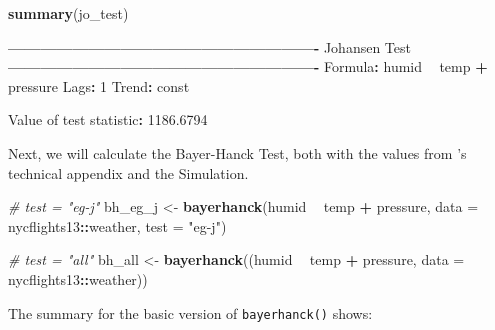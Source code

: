 \documentclass[11pt,a4paper]{article}
\newenvironment{Shaded}{\begin{snugshade}}{\end{snugshade}}
\newcommand{\CommentTok}[1]{\textcolor[rgb]{0.56,0.35,0.01}{\textit{#1}}}
\newcommand{\DataTypeTok}[1]{\textcolor[rgb]{0.13,0.29,0.53}{#1}}
\newcommand{\DecValTok}[1]{\textcolor[rgb]{0.00,0.00,0.81}{#1}}
\newcommand{\FloatTok}[1]{\textcolor[rgb]{0.00,0.00,0.81}{#1}}
\newcommand{\KeywordTok}[1]{\textcolor[rgb]{0.13,0.29,0.53}{\textbf{#1}}}
\newcommand{\NormalTok}[1]{#1}
\newcommand{\OperatorTok}[1]{\textcolor[rgb]{0.81,0.36,0.00}{\textbf{#1}}}
\newcommand{\StringTok}[1]{\textcolor[rgb]{0.31,0.60,0.02}{#1}}
\begin{document}
\begin{Shaded}
\begin{Highlighting}[]
\KeywordTok{summary}\NormalTok{(jo_test)}

\OperatorTok{----------------------------------------------------------}
\NormalTok{Johansen Test}
\OperatorTok{----------------------------------------------------------}
\NormalTok{Formula}\OperatorTok{:}\StringTok{ }\NormalTok{humid }\OperatorTok{~}\StringTok{ }\NormalTok{temp }\OperatorTok{+}\StringTok{ }\NormalTok{pressure}
\NormalTok{Lags}\OperatorTok{:}\StringTok{ }\DecValTok{1}
\NormalTok{Trend}\OperatorTok{:}\StringTok{ }\NormalTok{const}
 
\NormalTok{Value of test statistic}\OperatorTok{:}\StringTok{ }\FloatTok{1186.6794}
\end{Highlighting}
\end{Shaded}

Next, we will calculate the Bayer-Hanck Test, both with the values from
\textcite{Bayerhanck2009}'s technical appendix and the Simulation.

\begin{Shaded}
\begin{Highlighting}[]
\CommentTok{# test = "eg-j"}
\NormalTok{bh_eg_j <-}\StringTok{ }\KeywordTok{bayerhanck}\NormalTok{(humid }\OperatorTok{~}\StringTok{ }\NormalTok{temp }\OperatorTok{+}\StringTok{ }\NormalTok{pressure, }
                      \DataTypeTok{data =}\NormalTok{ nycflights13}\OperatorTok{::}\NormalTok{weather, }
                      \DataTypeTok{test =} \StringTok{"eg-j"}\NormalTok{)}

\CommentTok{# test = "all"}
\NormalTok{bh_all <-}\StringTok{ }\KeywordTok{bayerhanck}\NormalTok{((humid }\OperatorTok{~}\StringTok{ }\NormalTok{temp }\OperatorTok{+}\StringTok{ }\NormalTok{pressure, }
                      \DataTypeTok{data =}\NormalTok{ nycflights13}\OperatorTok{::}\NormalTok{weather))}
\end{Highlighting}
\end{Shaded}

The summary for the basic version of \texttt{bayerhanck()} shows:
\end{document}
